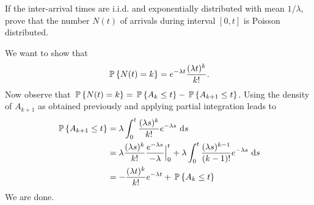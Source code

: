 \begin{question}
  If the inter-arrival times are i.i.d. and exponentially distributed
  with mean $1/\lambda$, prove that the number $N(t)$ of arrivals
  during interval $[0,t]$ is Poisson distributed.
    \begin{solution}
      We want to show that
    \begin{equation*}
      \P{N(t)=k} = e^{-\lambda t}\frac{(\lambda t)^k}{k!}.
    \end{equation*}
    Now observe that
    $\P{N(t)=k} = \P{A_k \leq t} - \P{A_{k+1} \leq t}$.  Using the
    density of $A_{k+1}$ as obtained previously and applying partial
    integration leads to
\begin{equation*}
  \begin{split}
\P{A_{k+1} \leq t} 
&= \lambda \int_0^t \frac{(\lambda s)^{k}}{k!}e^{-\lambda s}\, \d s \\
&= \lambda \frac{(\lambda s)^{k}}{k!}\frac{e^{-\lambda s}}{-\lambda} \Big|_{0}^t + \lambda \int_0^t \frac{(\lambda s)^{k-1}}{(k-1)!}e^{-\lambda s}\, \d s \\
&= - \frac{(\lambda t)^{k}}{k!} e^{-\lambda t} + \P{A_k \leq t}
  \end{split}
\end{equation*}
We are done.
    \end{solution}
\end{question}


